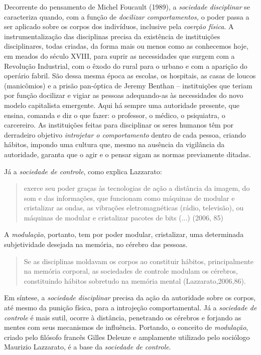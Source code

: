 Decorrente do pensamento de Michel Foucault (1989), a \emph{sociedade
disciplinar} se caracteriza quando, com a função de \emph{docilizar
comportamentos,} o poder passa a ser aplicado sobre os corpos dos
indivíduos, inclusive pela \emph{coerção física}. A instrumentalização
das disciplinas precisa da existência de instituições disciplinares,
todas criadas, da forma mais ou menos como as conhecemos hoje, em meados
do século XVIII, para suprir as necessidades que surgem com a Revolução
Industrial, com o êxodo do rural para o urbano e com a aparição do
operário fabril. São dessa mesma época as escolas, os hospitais, as
casas de loucos (manicômios) e a prisão pan-óptica de Jeremy Benthan --
instituições que teriam por função docilizar e vigiar as pessoas
adequando-as às necessidades do novo modelo capitalista emergente. Aqui
há sempre uma autoridade presente, que ensina, comanda e diz o que
fazer: o professor, o médico, o psiquiatra, o carcereiro. As
instituições feitas para disciplinar os seres humanos têm por derradeiro
objetivo \emph{introjetar o comportamento} dentro de cada pessoa,
criando hábitos, impondo uma cultura que, mesmo na ausência da
vigilância da autoridade, garanta que o agir e o pensar sigam as normas
previamente ditadas.

Já a \emph{sociedade de controle}, como explica Lazzarato:

\begin{quote}
exerce seu poder graças às tecnologias de ação a distância da imagem, do
som e das informações, que funcionam como máquinas de modular e
cristalizar as ondas, as vibrações eletromagnéticas (rádio, televisão),
ou máquinas de modular e cristalizar pacotes de bits (...) (2006, 85)
\end{quote}

A \emph{modulação}, portanto, tem por poder modular, cristalizar, uma
determinada subjetividade desejada na memória, no cérebro das pessoas.

\begin{quote}
Se as disciplinas moldavam os corpos ao constituir hábitos,
principalmente na memória corporal, as sociedades de controle modulam os
cérebros, constituindo hábitos sobretudo na memória mental
(Lazzarato,2006,86).
\end{quote}

Em síntese, a \emph{sociedade disciplinar} precisa da ação da autoridade
sobre os corpos, até mesmo da punição física, para a introjeção
comportamental. Já a \emph{sociedade de controle} é mais sutil, ocorre à
distância, penetrando os cérebros e forjando as mentes com seus
mecanismos de influência. Portando, o conceito de \emph{modulação},
criado pelo filósofo francês Gilles Deleuze e amplamente utilizado pelo
sociólogo Maurizio Lazzarato, é a base da \emph{sociedade de controle}.


